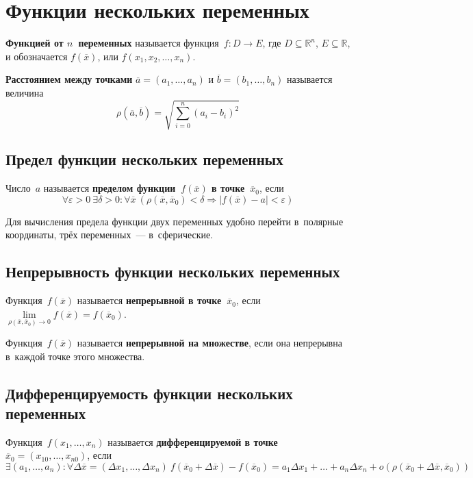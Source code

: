 \section{Функции нескольких переменных}
 \textbf{Функцией от $n$~переменных} называется функция~$f \colon D \to E$, где $D \subseteq \mathbb R^n$, $E \subseteq \mathbb R$, и обозначается $f(\overline x)$, или $f(x_1, x_2, \ldots, x_n)$.

  \textbf{Расстоянием между точками} $\overline a = (a_1, \ldots, a_n)$ и $\overline b = (b_1, \ldots, b_n)$ называется величина
\begin{equation*}
\rho(\overline a, \overline b) = \sqrt{\sum_{i=0}^n (a_i - b_i)^2}
\end{equation*}

\subsection{Предел функции нескольких переменных}
Число~$a$ называется \textbf{пределом функции~$f(\overline x)$ в точке~$\overline x_0$}, если
\begin{equation*}
\forall \varepsilon > 0 \ \exists \delta > 0 \colon \forall \overline x \ (\rho(\overline x, \overline x_0) < \delta \Rightarrow |f(\overline x) - a| < \varepsilon)
\end{equation*}

Для вычисления предела функции двух переменных удобно перейти в~полярные координаты, трёх переменных~--- в~сферические.

\subsection{Непрерывность функции нескольких переменных}
 Функция~$f(\overline x)$ называется \textbf{непрерывной в точке~$\overline x_0$}, если
$\lim\limits_{\rho(\overline x, \overline x_0) \to 0} f(\overline x) = f(\overline x_0)$.

Функция~$f(\overline x)$ называется \textbf{непрерывной на множестве}, если она непрерывна в~каждой точке этого множества.

\subsection{Дифференцируемость функции нескольких переменных}
 Функция~$f(x_1, \ldots, x_n)$ называется \textbf{дифференцируемой в точке~$\overline x_0 = (x_{10}, \ldots, x_{n0})$}, если
\begin{equation*}
\exists (a_1, \ldots, a_n) \colon \forall \Delta \overline x = (\Delta x_1, \ldots, \Delta x_n) \
f(\overline x_0 + \Delta \overline x) - f(\overline x_0) =
a_1 \Delta x_1 + \ldots + a_n \Delta x_n + o(\rho(\overline x_0 + \Delta \overline x, \overline x_0))
\end{equation*}

